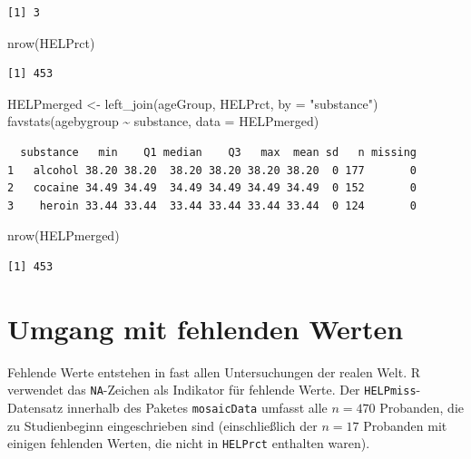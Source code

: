 \documentclass[
  ngerman,
]{scrbook}
\newenvironment{Shaded}{\begin{snugshade}}{\end{snugshade}}
\newcommand{\AttributeTok}[1]{\textcolor[rgb]{0.77,0.63,0.00}{#1}}
\newcommand{\FunctionTok}[1]{\textcolor[rgb]{0.00,0.00,0.00}{#1}}
\newcommand{\NormalTok}[1]{#1}
\newcommand{\OtherTok}[1]{\textcolor[rgb]{0.56,0.35,0.01}{#1}}
\newcommand{\SpecialCharTok}[1]{\textcolor[rgb]{0.00,0.00,0.00}{#1}}
\newcommand{\StringTok}[1]{\textcolor[rgb]{0.31,0.60,0.02}{#1}}
\begin{document}
\begin{verbatim}
[1] 3
\end{verbatim}

\begin{Shaded}
\begin{Highlighting}[]
 \FunctionTok{nrow}\NormalTok{(HELPrct)}
\end{Highlighting}
\end{Shaded}

\begin{verbatim}
[1] 453
\end{verbatim}

\begin{Shaded}
\begin{Highlighting}[]
\NormalTok{HELPmerged }\OtherTok{\textless{}{-}} \FunctionTok{left\_join}\NormalTok{(ageGroup, HELPrct, }\AttributeTok{by =} \StringTok{"substance"}\NormalTok{)}
\FunctionTok{favstats}\NormalTok{(agebygroup }\SpecialCharTok{\textasciitilde{}}\NormalTok{ substance, }\AttributeTok{data =}\NormalTok{ HELPmerged)}
\end{Highlighting}
\end{Shaded}

\begin{verbatim}
  substance   min    Q1 median    Q3   max  mean sd   n missing
1   alcohol 38.20 38.20  38.20 38.20 38.20 38.20  0 177       0
2   cocaine 34.49 34.49  34.49 34.49 34.49 34.49  0 152       0
3    heroin 33.44 33.44  33.44 33.44 33.44 33.44  0 124       0
\end{verbatim}

\begin{Shaded}
\begin{Highlighting}[]
\FunctionTok{nrow}\NormalTok{(HELPmerged)}
\end{Highlighting}
\end{Shaded}

\begin{verbatim}
[1] 453
\end{verbatim}

\hypertarget{missings}{%
\section{Umgang mit fehlenden Werten}\label{missings}}

Fehlende Werte entstehen in fast allen Untersuchungen der realen Welt. \textsf{R} verwendet das \texttt{NA}-Zeichen als Indikator für fehlende Werte. Der \texttt{HELPmiss}-Datensatz innerhalb des Paketes \texttt{mosaicData} umfasst alle \(n = 470\) Probanden, die zu Studienbeginn eingeschrieben sind (einschließlich der \(n = 17\) Probanden mit einigen fehlenden Werten, die nicht in \texttt{HELPrct} enthalten waren).
\end{document}
